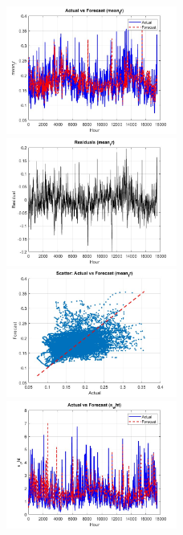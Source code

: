 \label{results all models 5 days}

\begin{figure}[ht!]
    \centering
    \includegraphics[width=0.5\textwidth]{graphs/hybrid/120 hours/mean_fr/actual vs forecast.jpg}\hfill
    \includegraphics[width=0.5\textwidth]{graphs/hybrid/120 hours/mean_fr/residuals.jpg}\\[1ex]
    \includegraphics[width=0.5\textwidth]{graphs/hybrid/120 hours/mean_fr/scatter plot.jpg}\hfill
    \includegraphics[width=0.5\textwidth]{graphs/hybrid/120 hours/s_wht/actual vs forecast.jpg}\\[1ex]
\end{figure}
